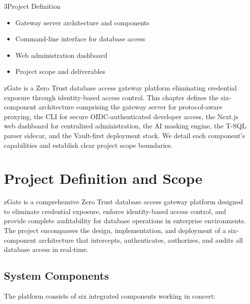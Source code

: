 
\begin{sectionintro}{3}{Project Definition}{
  \begin{itemize}[leftmargin=1.5em]
    \item Gateway server architecture and components
    \item Command-line interface for database access
    \item Web administration dashboard
    \item Project scope and deliverables
  \end{itemize}
}
zGate is a Zero Trust database access gateway platform eliminating credential exposure through identity-based access control. This chapter defines the six-component architecture comprising the gateway server for protocol-aware proxying, the CLI for secure OIDC-authenticated developer access, the Next.js web dashboard for centralized administration, the AI masking engine, the T-SQL parser sidecar, and the Vault-first deployment stack. We detail each component's capabilities and establish clear project scope boundaries.
\end{sectionintro}

\section{Project Definition and Scope}
zGate is a comprehensive Zero Trust database access gateway platform designed to eliminate credential exposure, enforce identity-based access control, and provide complete auditability for database operations in enterprise environments. The project encompasses the design, implementation, and deployment of a six-component architecture that intercepts, authenticates, authorizes, and audits all database access in real-time.

\subsection{System Components}
The platform consists of six integrated components working in concert:

